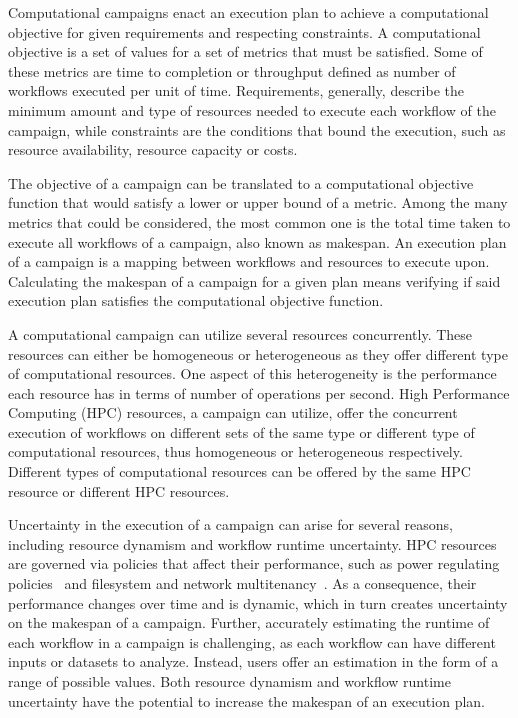 \label{ch:campaigns}
Computational campaigns enact an execution plan to achieve a computational 
objective for given requirements and respecting constraints. A computational 
objective is a set of values for a set of metrics that must be satisfied. Some 
of these metrics are time to completion or throughput defined as number of 
workflows executed per unit of time. Requirements, generally, describe the 
minimum amount and type of resources needed to execute each workflow of the 
campaign, while constraints are the conditions that bound the execution, such 
as resource availability, resource capacity or costs.

The objective of a campaign can be translated to a computational objective 
function that would satisfy a lower or upper bound of a metric. Among the many 
metrics that could be considered, the most common one is the total time taken 
to execute all workflows of a campaign, also known as makespan. An execution 
plan of a campaign is a mapping between workflows and resources to execute 
upon. Calculating the makespan of a campaign for a given plan means verifying 
if said execution plan satisfies the computational objective function.

A computational campaign can utilize several resources concurrently. These 
resources can either be homogeneous or heterogeneous as they offer different 
type of computational resources. One aspect of this heterogeneity is the 
performance each resource has in terms of number of operations per second. 
High Performance Computing (HPC) resources, a campaign can utilize, offer the 
concurrent execution of workflows on different sets of the same type or 
different type of computational resources, thus homogeneous or heterogeneous 
respectively. Different types of computational resources can be offered by the 
same HPC resource or different HPC resources.

Uncertainty in the execution of a campaign can arise for several reasons, 
including resource dynamism and workflow runtime uncertainty. HPC resources 
are governed via policies that affect their performance, such as power 
regulating policies~\cite{inadomi2015analyzing} and filesystem and network  
multitenancy~\cite{brown2018interference}. As a consequence, their performance 
changes over time and is dynamic, which in turn creates uncertainty on the 
makespan of a campaign. Further, accurately estimating the runtime of each 
workflow in a campaign is challenging, as each workflow can have different 
inputs or datasets to analyze. Instead, users offer an estimation in the form 
of a range of possible values. Both resource dynamism and workflow runtime 
uncertainty have the potential to increase the makespan of an execution plan.

